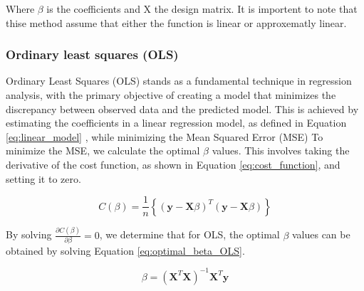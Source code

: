 Where $\beta$ is the coefficients and X the design matrix. It is importent to note 
that thise method assume that either the function is linear or approxematly linear.


\subsubsection{Ordinary least squares (OLS)}
\noindent Ordinary Least Squares (OLS) stands as a fundamental technique in 
regression analysis, with the primary objective of creating a model that 
minimizes the discrepancy between observed data and the predicted model. 
This is achieved by estimating the coefficients in a linear regression model, 
as defined in Equation \ref{eq:linear_model}
, while minimizing the Mean Squared 
Error (MSE) %
To minimize the MSE, we calculate the optimal $\beta$ values. This involves 
taking the derivative of the cost function, as shown in Equation \ref{eq:cost_function}, 
and setting it to zero.

\begin{equation}\label{eq:cost_function}
C(\beta) = \frac{1}{n} \left\lbrace ( \textbf{y} - \textbf{X}\beta )^T (\textbf{y} - \textbf{X}\beta)\right\rbrace 
\end{equation}

\noindent By solving $\frac{\partial C(\beta)}{\partial \beta} = 0$, we determine that 
for OLS, the optimal $\beta$ values can be obtained by solving Equation
\ref{eq:optimal_beta_OLS}.

\begin{equation}\label{eq:optimal_beta_OLS}
\beta = (\textbf{X}^T \textbf{X})^{-1}\textbf{X}^T \textbf{y} 
\end{equation}

